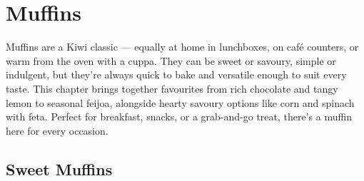 \chapter{Muffins}

Muffins are a Kiwi classic — equally at home in lunchboxes, on café counters, or warm from the oven with a cuppa.  
They can be sweet or savoury, simple or indulgent, but they’re always quick to bake and versatile enough to suit every taste.  
This chapter brings together favourites from rich chocolate and tangy lemon to seasonal feijoa, alongside hearty savoury options like corn and spinach with feta.  
Perfect for breakfast, snacks, or a grab-and-go treat, there’s a muffin here for every occasion.  

\minitoc

\section*{Sweet Muffins}

